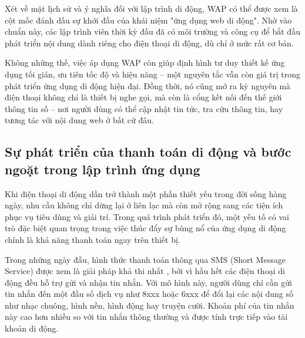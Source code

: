   \begin{flushleft}
  \hspace*{0.8cm}Xét về mặt lịch sử và ý nghĩa đối với lập trình di động, WAP có thể được xem là cột mốc đánh dấu sự khởi đầu của khái niệm "ứng dụng web di động". Nhờ vào chuẩn này, các lập trình viên thời kỳ đầu đã có môi trường và công cụ để bắt đầu phát triển nội dung dành riêng cho điện thoại di động, dù chỉ ở mức rất cơ bản.
  \end{flushleft}
  
  \begin{flushleft}
  \hspace*{0.8cm}Không những thế, việc áp dụng WAP còn giúp định hình tư duy thiết kế ứng dụng tối giản, ưu tiên tốc độ và hiệu năng – một nguyên tắc vẫn còn giá trị trong phát triển ứng dụng di động hiện đại. Đồng thời, nó cũng mở ra kỷ nguyên mà điện thoại không chỉ là thiết bị nghe gọi, mà còn là cổng kết nối đến thế giới thông tin số – nơi người dùng có thể cập nhật tin tức, tra cứu thông tin, hay tương tác với nội dung web ở bất cứ đâu.
  \end{flushleft}

\subsection{Sự phát triển của thanh toán di động và bước ngoặt trong lập trình ứng dụng}
\renewcommand{\labelitemi}{--}

\begin{flushleft}
\hspace*{0.8cm}Khi điện thoại di động dần trở thành một phần thiết yếu trong đời sống hàng ngày, nhu cầu không chỉ dừng lại ở liên lạc mà còn mở rộng sang các tiện ích phục vụ tiêu dùng và giải trí. Trong quá trình phát triển đó, một yếu tố có vai trò đặc biệt quan trọng trong việc thúc đẩy sự bùng nổ của ứng dụng di động chính là khả năng thanh toán ngay trên thiết bị.
\end{flushleft}

\begin{flushleft}
\hspace*{0.8cm}Trong những ngày đầu, hình thức thanh toán thông qua SMS (Short Message Service) được xem là giải pháp khả thi nhất \cite{sms-payment}, bởi vì hầu hết các điện thoại di động đều hỗ trợ gửi và nhận tin nhắn. Với mô hình này, người dùng chỉ cần gửi tin nhắn đến một đầu số dịch vụ như 8xxx hoặc 6xxx để đổi lại các nội dung số như nhạc chuông, hình nền, hình động hay truyện cười. Khoản phí của tin nhắn này cao hơn nhiều so với tin nhắn thông thường và được tính trực tiếp vào tài khoản di động.
\end{flushleft}

